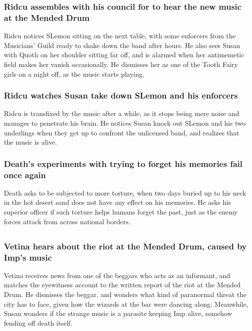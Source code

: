 \subsubsection{\Gls{Ridcu} assembles with his council for to hear the new music at the Mended Drum}
\Gls{Ridcu} notices \Gls{SLemon} sitting on the next table, with some enforcers from the Musicians'
Guild ready to shake down the band after hours. He also sees \Gls{Susan} with \Gls{Quoth} on her
shoulder sitting far off, and is alarmed when her antimemetic field makes her vanish occasionally.
He dismisses her as one of the Tooth Fairy girls on a night off, as the music starts playing.

\subsubsection{\Gls{Ridcu} watches \Gls{Susan} take down \Gls{SLemon} and his enforcers}
\Gls{Ridcu} is transfixed by the music after a while, as it stops being mere noise and manages to
penetrate his brain. He notices \Gls{Susan} knock out \Gls{SLemon} and his two underlings when they
get up to confront the unlicensed band, and realizes that the music is alive.

\subsubsection{\Gls{Death}'s experiments with trying to forget his memories fail once again}
\Gls{Death} asks to be subjected to more torture, when two days buried up to his neck in the hot
desert sand does not have any effect on his memories. He asks his superior officer if such torture
helps humans forget the past, just as the enemy forces attack from across national borders.

\subsection{}
\subsubsection{\Gls{Vetina} hears about the riot at the Mended Drum, caused by \Gls{Imp}'s music}
\Gls{Vetina} receives news from one of the beggars who acts as an informant, and matches the
eyewitness account to the written report of the riot at the Mended Drum. He dismisses the beggar,
and wonders what kind of paranormal threat the city has to face, given how the wizards at the bar
were dancing along. Meanwhile, \Gls{Susan} wonders if the strange music is a parasite keeping
\Gls{Imp} alive, somehow fending off death itself.


